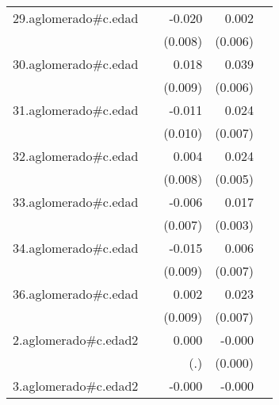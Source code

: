 {\begin{longtable}{l*{4}{D{.}{.}{-1}}}
\addlinespace
29.aglomerado#c.edad&                     &      -0.020\sym{*}  &       0.002         &                     \\
            &                     &     (0.008)         &     (0.006)         &                     \\
\addlinespace
30.aglomerado#c.edad&                     &       0.018\sym{*}  &       0.039\sym{***}&                     \\
            &                     &     (0.009)         &     (0.006)         &                     \\
\addlinespace
31.aglomerado#c.edad&                     &      -0.011         &       0.024\sym{***}&                     \\
            &                     &     (0.010)         &     (0.007)         &                     \\
\addlinespace
32.aglomerado#c.edad&                     &       0.004         &       0.024\sym{***}&                     \\
            &                     &     (0.008)         &     (0.005)         &                     \\
\addlinespace
33.aglomerado#c.edad&                     &      -0.006         &       0.017\sym{***}&                     \\
            &                     &     (0.007)         &     (0.003)         &                     \\
\addlinespace
34.aglomerado#c.edad&                     &      -0.015         &       0.006         &                     \\
            &                     &     (0.009)         &     (0.007)         &                     \\
\addlinespace
36.aglomerado#c.edad&                     &       0.002         &       0.023\sym{**} &                     \\
            &                     &     (0.009)         &     (0.007)         &                     \\
\addlinespace
2.aglomerado#c.edad2&                     &       0.000         &      -0.000\sym{*}  &                     \\
            &                     &         (.)         &     (0.000)         &                     \\
\addlinespace
3.aglomerado#c.edad2&                     &      -0.000         &      -0.000\sym{***}&                     \\

\end{longtable}}
